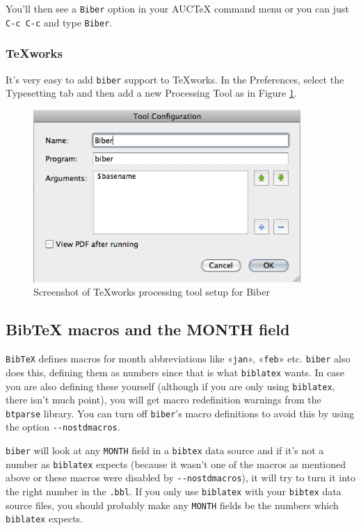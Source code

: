\documentclass{ltxdockit}
\begin{document}
\noindent You'll then see a \verb+Biber+ option in your AUCTeX command menu or
you can just \verb+C-c C-c+ and type \verb+Biber+.

\subsubsection{TeXworks}

It's very easy to add \verb+biber+ support to TeXworks. In the Preferences,
select the Typesetting tab and then add a new Processing Tool as in Figure
\ref{fig:biber-texworks}.

\begin{figure}[!htbp]
  \centering
  \includegraphics[width=4in,keepaspectratio=true]{biber-texworks.png}
  \caption{Screenshot of TeXworks processing tool setup for Biber}
  \label{fig:biber-texworks}
\end{figure}

\subsection{BibTeX macros and the MONTH field}

\verb+BibTeX+ defines macros for month abbreviations
like «\verb+jan+», «\verb+feb+» etc. \verb+biber+ also does this,
defining them as numbers since that is what \verb+biblatex+ wants. In
case you are also defining these yourself (although if you are only
using \verb+biblatex+, there isn't much point), you will get macro
redefinition warnings from the \verb+btparse+ library. You can turn
off \verb+biber+'s macro definitions to avoid this by using the option
\verb+--nostdmacros+.

\verb+biber+ will look at any \verb+MONTH+ field in a \verb+bibtex+ data
source and if it's not a number as \verb+biblatex+ expects (because it
wasn't one of the macros as mentioned above or these macros were disabled
by \verb+--nostdmacros+), it will try to turn it into the right number in
the \verb+.bbl+. If you only use \verb+biblatex+ with your \verb+bibtex+
data source files, you should probably make any \verb+MONTH+ fields be the
numbers which \verb+biblatex+ expects.
\end{document}
